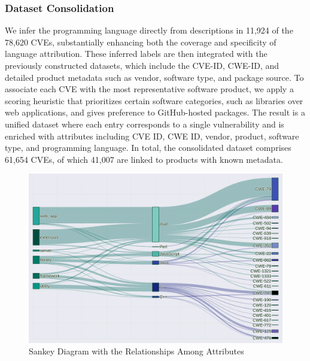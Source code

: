 \subsubsection{Dataset Consolidation}
We infer the programming language directly from descriptions in 11,924 of the 78,620 CVEs, substantially enhancing both the coverage and specificity of language attribution. These inferred labels are then integrated with the previously constructed datasets, which include the CVE-ID, CWE-ID, and detailed product metadata such as vendor, software type, and package source. To associate each CVE with the most representative software product, we apply a scoring heuristic that prioritizes certain software categories, such as libraries over web applications, and gives preference to GitHub-hosted packages. The result is a unified dataset where each entry corresponds to a single vulnerability and is enriched with attributes including CVE ID, CWE ID, vendor, product, software type, and programming language. In total, the consolidated dataset comprises 61,654 CVEs, of which 41,007 are linked to products with known metadata.

\begin{figure}[!h]
	\centering
    \includegraphics[width=1\textwidth]{figures/chapter_2/sankey_software_language_cwe.png}
	\caption{Sankey Diagram with the Relationships Among Attributes}
	\label{fig:sakney_attributes}
\end{figure}


